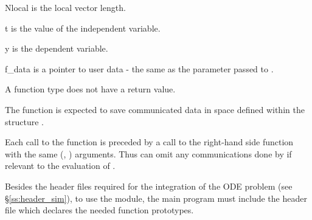 {
  \begin{args}[Nlocal]
  \item[Nlocal] 
    is the local vector length.
  \item[t]
    is the value of the independent variable.
  \item[y]
    is the dependent variable. 
  \item[f\_data]
    is a pointer to user data - the same as the       
    parameter passed to .  
  \end{args}
}
{
  A  function type does not have a return value.
}
{
  The  function is expected to save communicated data in space defined within the
  structure . 

  Each call to the  function is preceded by a call to the right-hand side
  function  with the same (, ) arguments.  Thus  can omit 
  any communications done by  if relevant to the evaluation of .  
}


Besides the header files required for the integration of the ODE problem
(see \S\ref{ss:header_sim}),  to use the {\cvbbdpre} module, the main program 
must include the header file  which declares the needed
function prototypes.

